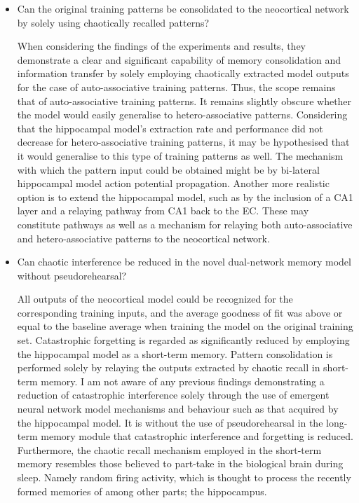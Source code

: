 \begin{itemize}
    \item Can the original training patterns be consolidated to the neocortical network by solely using chaotically recalled patterns?
    
    When considering the findings of the experiments and results, they demonstrate a clear and significant capability of memory consolidation and information transfer by solely employing chaotically extracted model outputs for the case of auto-associative training patterns. Thus, the scope remains that of auto-associative training patterns. It remains slightly obscure whether the model would easily generalise to hetero-associative patterns. Considering that the hippocampal model's extraction rate and performance did not decrease for hetero-associative training patterns, it may be hypothesised that it would generalise to this type of training patterns as well. The mechanism with which the pattern input could be obtained might be by bi-lateral hippocampal model action potential propagation. Another more realistic option is to extend the hippocampal model, such as by the inclusion of a CA1 layer and a relaying pathway from CA1 back to the EC. These may constitute pathways as well as a mechanism for relaying both auto-associative and hetero-associative patterns to the neocortical network.
    
    \item Can chaotic interference be reduced in the novel dual-network memory model without pseudorehearsal?
    
    All outputs of the neocortical model could be recognized for the corresponding training inputs, and the average goodness of fit was above or equal to the baseline average when training the model on the original training set. Catastrophic forgetting is regarded as significantly reduced by employing the hippocampal model as a short-term memory. Pattern consolidation is performed solely by relaying the outputs extracted by chaotic recall in short-term memory. I am not aware of any previous findings demonstrating a reduction of catastrophic interference solely through the use of emergent neural network model mechanisms and behaviour such as that acquired by the hippocampal model. It is without the use of pseudorehearsal in the long-term memory module that catastrophic interference and forgetting is reduced. Furthermore, the chaotic recall mechanism employed in the short-term memory resembles those believed to part-take in the biological brain during sleep. Namely random firing activity, which is thought to process the recently formed memories of among other parts; the hippocampus.
    
\end{itemize}

